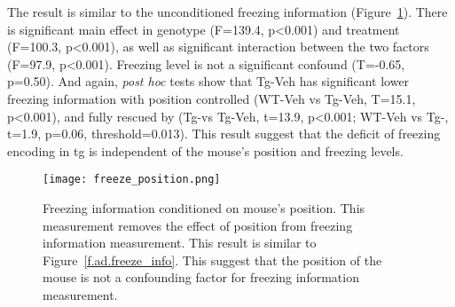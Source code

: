 The result is similar to the unconditioned freezing information (Figure~\ref{f.ad.freeze_ctrl}). There is significant main effect in genotype (F=139.4, p<0.001) and treatment (F=100.3, p<0.001), as well as significant interaction between the two factors (F=97.9, p<0.001). Freezing level is not a significant confound (T=-0.65, p=0.50). And again, \textit{post hoc} tests show that Tg-Veh has significant lower freezing information with position controlled (WT-Veh vs Tg-Veh, T=15.1, p<0.001), and fully rescued by \tglu (Tg-\glu vs Tg-Veh, t=13.9, p<0.001; WT-Veh vs Tg-\glu, t=1.9, p=0.06, threshold=0.013). This result suggest that the deficit of freezing encoding in \gls{tg} is independent of the mouse's position and freezing levels.
\begin{figure}[h]
    \texttt{[image: freeze\_position.png]}
    \caption{Freezing information conditioned on mouse's position. This measurement removes the effect of position from freezing information measurement. This result is similar to Figure~\ref{f.ad.freeze_info}. This suggest that the position of the mouse is not a confounding factor for freezing information measurement. \label{f.ad.freeze_ctrl}}
\end{figure}


